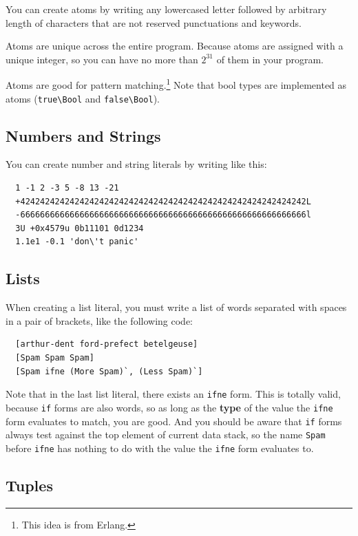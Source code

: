 \documentclass{book}
\begin{document}
You can create atoms by writing any lowercased letter followed by arbitrary length of characters that are not reserved punctuations and keywords.

Atoms are unique across the entire program. Because atoms are assigned with a unique integer, so you can have no more than $2^{31}$ of them in your program.


Atoms are good for pattern matching.\footnote{This idea is from Erlang.} Note that bool types are implemented as atoms (\texttt{true\textbackslash Bool} and \texttt{false\textbackslash Bool}).

\subsection{Numbers and Strings}

You can create number and string literals by writing like this:
\begin{verbatim}
  1 -1 2 -3 5 -8 13 -21
  +4242424242424242424242424242424242424242424242424242424242L
  -6666666666666666666666666666666666666666666666666666666666l
  3U +0x4579u 0b11101 0d1234
  1.1e1 -0.1 'don\'t panic'
\end{verbatim}

\subsection{Lists}

When creating a list literal, you must write a list of words separated with spaces in a pair of brackets, like the following code:
\begin{verbatim}
  [arthur-dent ford-prefect betelgeuse]
  [Spam Spam Spam]
  [Spam ifne (More Spam)`, (Less Spam)`]
\end{verbatim}

Note that in the last list literal, there exists an \texttt{ifne} form. This
is totally valid, because \texttt{if} forms are also words, so as long as the \textbf{type} of the value the \texttt{ifne} form evaluates to match, you are good. And you should be aware that \texttt{if} forms always test against the top element of current data stack, so the name \texttt{Spam} before \texttt{ifne} has nothing to do with the value the \texttt{ifne} form evaluates to.

\subsection{Tuples}
\end{document}
